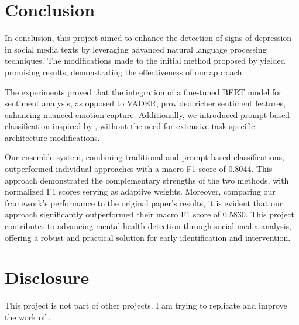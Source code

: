 \documentclass{article}
\begin{document}
\section{Conclusion}

In conclusion, this project aimed to enhance the detection of signs of depression in social media texts by leveraging advanced natural language processing techniques. The modifications made to the initial method proposed by \citep{wang2022nycu_twd} yielded promising results, demonstrating the effectiveness of our approach.

The experiments proved that the integration of a fine-tuned BERT model for sentiment analysis, as opposed to VADER, provided richer sentiment features, enhancing nuanced emotion capture. Additionally, we introduced prompt-based classification inspired by \citep{deng2022beike}, without the need for extensive task-specific architecture modifications.

Our ensemble system, combining traditional and prompt-based classifications, outperformed individual approaches with a macro F1 score of 0.8044. This approach demonstrated the complementary strengths of the two methods, with normalized F1 scores serving as adaptive weights. Moreover, comparing our framework's performance to the original paper's results, it is evident that our approach significantly outperformed their macro F1 score of 0.5830. This project contributes to advancing mental health detection through social media analysis, offering a robust and practical solution for early identification and intervention.

\clearpage

\section*{Disclosure}

This project is not part of other projects. I am trying to replicate and improve the work of \citep{wang2022nycu_twd}.


\end{document}
